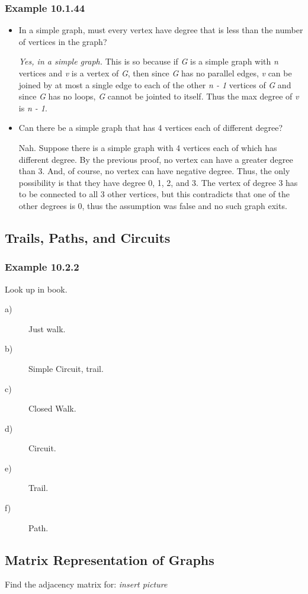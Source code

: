 \documentclass{article}
\begin{document}
\subsubsection{Example 10.1.44}
\begin{itemize}
\item In a simple graph, must every vertex have degree that is less than the number of vertices in the graph?

\textit{Yes, in a simple graph.} This is so because if \textit{G} is a simple graph with \textit{n} vertices and \textit{v} is a vertex of \textit{G}, then since \textit{G} has no parallel edges, \textit{v} can be joined by at most a single edge to each of the other \textit{n - 1} vertices of \textit{G} and since \textit{G} has no loops, \textit{G} cannot be jointed to itself. Thus the max degree of \textit{v} is \textit{n - 1}.

\item Can there be a simple graph that has 4 vertices each of different degree?

Nah. Suppose there is a simple graph with 4 vertices each of which has different degree. By the previous proof, no vertex can have a greater degree than 3. And, of course, no vertex can have negative degree. Thus, the only possibility is that they have degree 0, 1, 2, and 3. The vertex of degree 3 has to be connected to all 3 other vertices, but this contradicts that one of the other degrees is 0, thus the assumption was false and no such graph exits.
\end{itemize}

\subsection{Trails, Paths, and Circuits}
\subsubsection{Example 10.2.2}
Look up in book.
\begin{description}
\item[a)] Just walk.
\item[b)] Simple Circuit, trail.
\item[c)] Closed Walk.
\item[d)] Circuit.
\item[e)] Trail.
\item[f)] Path.
\end{description}

\subsection{Matrix Representation of Graphs}
Find the adjacency matrix for: \textit{insert picture}
\end{document}
